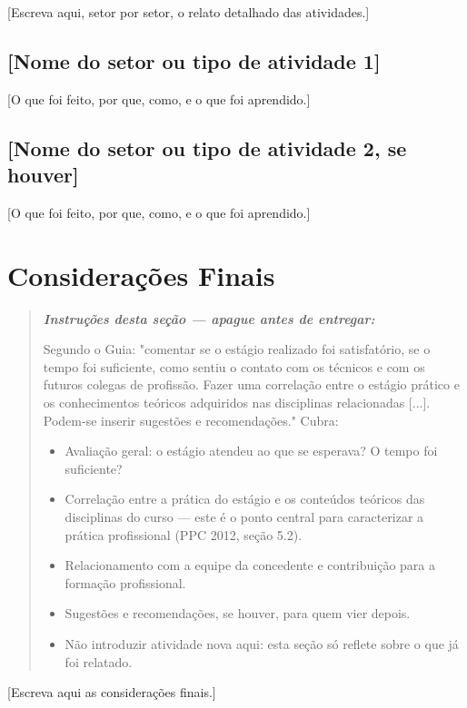 \documentclass[article,12pt,a4paper,oneside]{abntex2}
\newenvironment{instrucoes}{%
  \begin{quotation}\footnotesize\itshape
  \noindent\textbf{\upshape Instruções desta seção — apague antes de entregar:}\par\smallskip
}{%
  \end{quotation}
}
\begin{document}
[Escreva aqui, setor por setor, o relato detalhado das atividades.]

\subsection{[Nome do setor ou tipo de atividade 1]}

[O que foi feito, por que, como, e o que foi aprendido.]

\subsection{[Nome do setor ou tipo de atividade 2, se houver]}

[O que foi feito, por que, como, e o que foi aprendido.]

\section{Considerações Finais}

\begin{instrucoes}
Segundo o Guia: "comentar se o estágio realizado foi satisfatório, se o tempo foi suficiente, como sentiu o contato com os técnicos e com os futuros colegas de profissão. Fazer uma correlação entre o estágio prático e os conhecimentos teóricos adquiridos nas disciplinas relacionadas [...]. Podem-se inserir sugestões e recomendações." Cubra:
\begin{itemize}
  \item Avaliação geral: o estágio atendeu ao que se esperava? O tempo foi suficiente?
  \item Correlação entre a prática do estágio e os conteúdos teóricos das disciplinas do curso — este é o ponto central para caracterizar a prática profissional (PPC 2012, seção 5.2).
  \item Relacionamento com a equipe da concedente e contribuição para a formação profissional.
  \item Sugestões e recomendações, se houver, para quem vier depois.
  \item Não introduzir atividade nova aqui: esta seção só reflete sobre o que já foi relatado.
\end{itemize}
\end{instrucoes}

[Escreva aqui as considerações finais.]

\postextual
\end{document}
